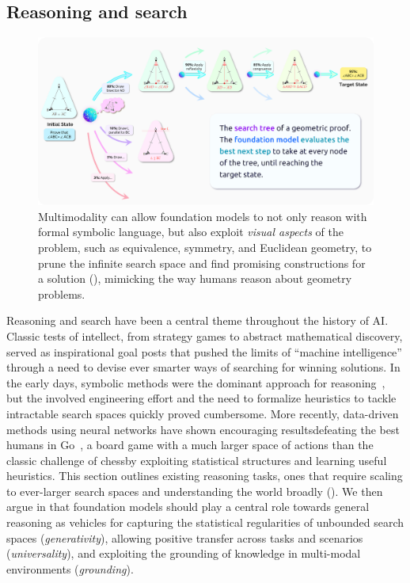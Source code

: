 \newsection
\subsection{Reasoning and search}
\label{sec:reasoning}


\begin{figure}[!ht]
\centering
\includegraphics[width=\linewidth]{capabilities/figures/Reasoning_1.png}
\caption{\label{fig:reasoning-geometry} Multimodality can allow foundation models to not only reason with formal symbolic language, but also exploit \emph{visual aspects} of the problem, such as equivalence, symmetry, and Euclidean geometry, to prune the infinite search space and find promising constructions for a solution (), mimicking the way humans reason about geometry problems.}
\end{figure}

Reasoning and search have been a central theme throughout the history of AI. Classic tests of intellect, from strategy games to abstract mathematical discovery, served as inspirational goal posts that pushed the limits of ``machine intelligence'' through a need to devise ever smarter ways of searching for winning solutions.
In the early days, symbolic methods were the dominant approach for reasoning~\citep{DBLP:books/aw/RN2020}, but the involved engineering effort and the need to formalize heuristics to tackle intractable search spaces quickly proved cumbersome. 
More recently, data-driven methods using neural networks have shown encouraging results\dash{}\eg defeating the best humans in Go~\citep{DBLP:journals/nature/SilverHMGSDSAPL16}, a board game with a much larger space of actions than the classic challenge of chess\dash{}by exploiting statistical structures and learning useful heuristics.
This section outlines existing reasoning tasks, ones that require scaling to ever-larger search spaces and understanding the world broadly ().
We then argue in  that foundation models should play a central role towards general reasoning as vehicles for capturing the statistical regularities of unbounded search spaces (\emph{generativity}), allowing positive transfer across tasks and scenarios (\emph{universality}), and exploiting the grounding of knowledge in multi-modal environments (\emph{grounding}). 

